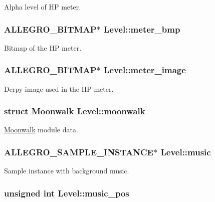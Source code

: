 Alpha level of H\-P meter. \hypertarget{structLevel_a4e78a54cbf3cdcc804f65acb03cef0b3}{
\subsubsection[{meter\-\_\-bmp}]{\setlength{\rightskip}{0pt plus 5cm}A\-L\-L\-E\-G\-R\-O\-\_\-\-B\-I\-T\-M\-A\-P$\ast$ Level\-::meter\-\_\-bmp}}\label{structLevel_a4e78a54cbf3cdcc804f65acb03cef0b3}
Bitmap of the H\-P meter. \hypertarget{structLevel_a371c97dfa3d564a19648cb1b72edbf60}{
\subsubsection[{meter\-\_\-image}]{\setlength{\rightskip}{0pt plus 5cm}A\-L\-L\-E\-G\-R\-O\-\_\-\-B\-I\-T\-M\-A\-P$\ast$ Level\-::meter\-\_\-image}}\label{structLevel_a371c97dfa3d564a19648cb1b72edbf60}
Derpy image used in the H\-P meter. \hypertarget{structLevel_ab9e39b9ac0f342332e034c59d55d6a07}{
\subsubsection[{moonwalk}]{\setlength{\rightskip}{0pt plus 5cm}struct {\bf Moonwalk} Level\-::moonwalk}}\label{structLevel_ab9e39b9ac0f342332e034c59d55d6a07}
\hyperlink{structMoonwalk}{Moonwalk} module data. \hypertarget{structLevel_a41c6aae8f508e078b02c291e1d6f8e67}{
\subsubsection[{music}]{\setlength{\rightskip}{0pt plus 5cm}A\-L\-L\-E\-G\-R\-O\-\_\-\-S\-A\-M\-P\-L\-E\-\_\-\-I\-N\-S\-T\-A\-N\-C\-E$\ast$ Level\-::music}}\label{structLevel_a41c6aae8f508e078b02c291e1d6f8e67}
Sample instance with background music. \hypertarget{structLevel_a13e322deb3298846260af31324e5b492}{
\subsubsection[{music\-\_\-pos}]{\setlength{\rightskip}{0pt plus 5cm}unsigned int Level\-::music\-\_\-pos}}\label{structLevel_a13e322deb3298846260af31324e5b492}

